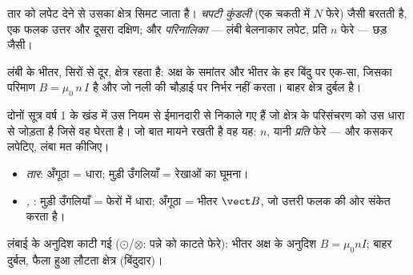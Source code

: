 \begin{definition}[कुंडली और परिनालिका]\label{def:g11:magnetic-fields:solenoid}
तार को लपेट देने से उसका क्षेत्र सिमट जाता है। \emph{चपटी
कुंडली} (एक चकती में $N$ फेरे)  
जैसी बरतती है, एक फलक उत्तर और दूसरा दक्षिण; और
\emph{परिनालिका} --- लंबी बेलनाकार लपेट, प्रति 
$n$ फेरे --- छड़  जैसी।
\end{definition}

\begin{proposition}[परिनालिका के भीतर का क्षेत्र]\label{prop:g11:magnetic-fields:solenoidfield}
लंबी  के भीतर, सिरों से दूर, क्षेत्र
\emph{} रहता है: अक्ष के समांतर और भीतर के हर बिंदु पर एक-सा, जिसका
परिमाण $B = \mu_0\, n\, I$ है और जो नली की चौड़ाई पर निर्भर नहीं करता। बाहर
क्षेत्र दुर्बल है।
\end{proposition}
\admitted

\begin{remark}
दोनों सूत्र वर्ष 1 के खंड में उस नियम से ईमानदारी से निकाले गए हैं जो
क्षेत्र के परिसंचरण को उस धारा से जोड़ता है जिसे वह घेरता है। जो बात
मायने रखती है वह यह: $n$, यानी \emph{प्रति } फेरे --- और
कसकर लपेटिए, लंबा मत कीजिए।
\end{remark}

\begin{method}[दायाँ हाथ, दो बार]\label{met:g11:magnetic-fields:righthand}
\begin{itemize}
  \item \emph{तार}: अँगूठा = धारा; मुड़ी उँगलियाँ = रेखाओं का घूमना।
  \item \emph{, }: मुड़ी उँगलियाँ = फेरों में
        धारा; अँगूठा = भीतर $\vect B$, जो उत्तरी फलक की ओर संकेत करता है।
\end{itemize}
\end{method}

\begin{omfigure}

{\small लंबाई के अनुदिश काटी गई  ($\odot$/$\otimes$: पन्ने को
काटते फेरे): भीतर अक्ष के अनुदिश  $B = \mu_0 n I$; बाहर दुर्बल, फैला हुआ लौटता
क्षेत्र (बिंदुदार)।}
\end{omfigure}

